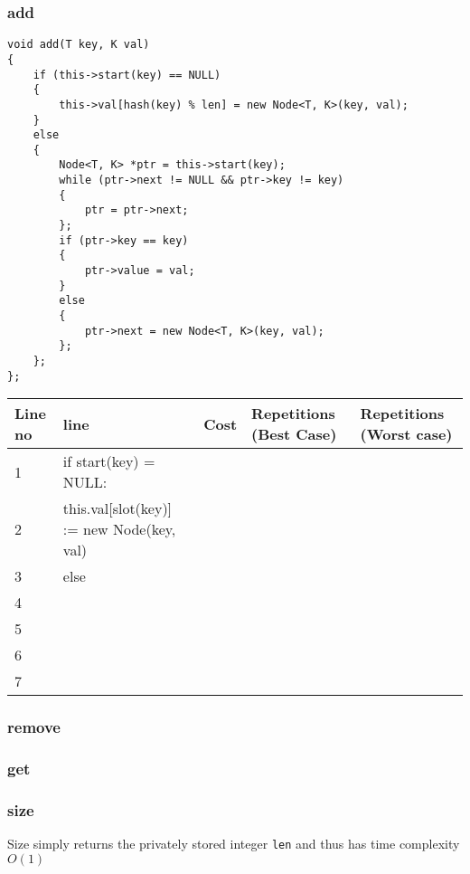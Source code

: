 \documentclass{article}
\newcommand\tab[1][0.4cm]{\hspace*{#1}}
\newcounter{Label}
\begin{document}
\subsubsection{add}

\begin{verbatim}
void add(T key, K val)
{
    if (this->start(key) == NULL)
    {
        this->val[hash(key) % len] = new Node<T, K>(key, val);
    }
    else
    {
        Node<T, K> *ptr = this->start(key);
        while (ptr->next != NULL && ptr->key != key)
        {
            ptr = ptr->next;
        };
        if (ptr->key == key)
        {
            ptr->value = val;
        }
        else
        {
            ptr->next = new Node<T, K>(key, val);
        };
    };
};
\end{verbatim}

\setcounter{Label}{0}%
\begin{tabular}{|l|l|l|l|l|}
\hline
 Line no & line & Cost & Repetitions (Best Case) & Repetitions (Worst case)\\
 \hline
 1 & if start(key) = NULL:  & & \\
 2 & \tab this.val[slot(key)] := new Node(key, val) & &\\
 3 & else  & &\\
 4 &  & &\\
 5 &  & &\\
 6 &  & &\\
 7 &  & &\\
 \hline
\end{tabular}

\subsubsection{remove}

\subsubsection{get}

\subsubsection{size}



Size simply returns the privately stored integer \texttt{len} and thus has time complexity $O(1)$
\end{document}
